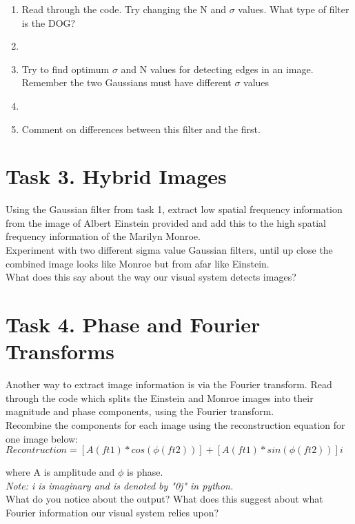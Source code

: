 \documentclass[12pt,english]{scrartcl}
\begin{document}
\begin{enumerate}
 \color{black}
 \item  Read through the code. Try changing the N and $\sigma$ values. What type of filter is the DOG? \\ 
 \item[]
 \color{black}
 \item Try to find optimum $\sigma$ and N values for detecting edges in an image. Remember the two Gaussians must have different $\sigma$ values \\
 \item[]
 \color{black}
 \item Comment on differences between this filter and the first. \\
\end{enumerate}

\section*{Task 3. Hybrid Images}
Using the Gaussian filter from task 1, extract low spatial frequency information from the image of Albert Einstein provided and add this to the high spatial frequency information of the Marilyn Monroe. \\
\bigskip
Experiment with two different sigma value Gaussian filters, until up close the combined image looks like Monroe but from afar like Einstein. \\
\bigskip
What does this say about the way our visual system detects images?

\section*{Task 4. Phase and Fourier Transforms}
Another way to extract image information is via the Fourier transform. Read through the code which splits the Einstein and Monroe images into their magnitude and phase components, using the Fourier transform.  \\
\bigskip
Recombine the components for each image using the reconstruction equation for one image below: \\
\bigskip
\centering
$Recontruction = [A(ft1)*cos(\phi(ft2))] + [A(ft1)*sin(\phi(ft2))] i$ \\
\raggedright
where A is amplitude and $\phi$ is phase.\\
\bigskip
{\it Note: i is imaginary and is denoted by "0j" in python.} \\
\bigskip
What do you notice about the output? What does this suggest about what Fourier information our visual system relies upon?
\end{document}

